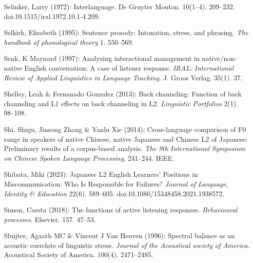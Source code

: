 \begin{styleBibliography}
Selinker, Larry (1972): Interlanguage. De Gruyter Mouton. 10(1–4). 209–232. doi:10.1515/iral.1972.10.1-4.209.
\end{styleBibliography}

\begin{styleBibliography}
Selkirk, Elisabeth (1995): Sentence prosody: Intonation, stress, and phrasing. \textit{The handbook of phonological theory} 1. 550–569.
\end{styleBibliography}

\begin{styleBibliography}
Senk, K Maynard (1997): Analyzing interactional management in native/non-native English conversation: A case of listener response. \textit{IRAL: International Review of Applied Linguistics in Language Teaching}. J. Groos Verlag. 35(1). 37.
\end{styleBibliography}

\begin{styleBibliography}
Shelley, Leah \& Fernanado Gonzalez (2013): Back channeling: Function of back channeling and L1 effects on back channeling in L2. \textit{Linguistic Portfolios} 2(1). 98–108.
\end{styleBibliography}

\begin{styleBibliography}
Shi, Shuju, Jinsong Zhang \& Yanlu Xie (2014): Cross-language comparison of F0 range in speakers of native Chinese, native Japanese and Chinese L2 of Japanese: Preliminary results of a corpus-based analysis. \textit{The 9th International Symposium on Chinese Spoken Language Processing}, 241–244. IEEE.
\end{styleBibliography}

\begin{styleBibliography}
Shibata, Miki (2023): Japanese L2 English Learners’ Positions in Miscommunication: Who Is Responsible for Failures? \textit{Journal of Language, Identity \& Education} 22(6). 589–605. doi:10.1080/15348458.2021.1938572.
\end{styleBibliography}

\begin{styleBibliography}
Simon, Carsta (2018): The functions of active listening responses. \textit{Behavioural processes}. Elsevier. 157. 47–53.
\end{styleBibliography}

\begin{styleBibliography}
Sluijter, Agaath MC \& Vincent J Van Heuven (1996): Spectral balance as an acoustic correlate of linguistic stress. \textit{Journal of the Acoustical society of America}. Acoustical Society of America. 100(4). 2471–2485.
\end{styleBibliography}

